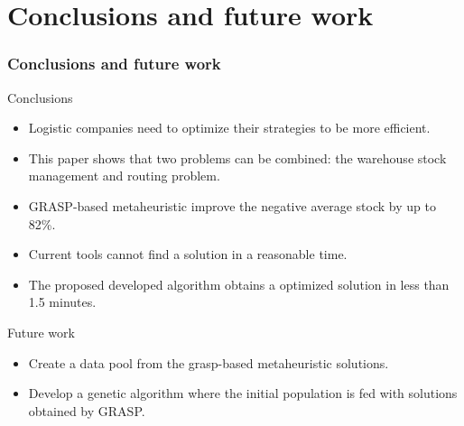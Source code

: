 \documentclass[t,compress,11pt,xcolor=dvipsnames,pdf,english]{beamer}
\begin{document}
\section{Conclusions and future work}

\begin{frame}[c]{ }
    \frametitle{Conclusions and future work}
    \begin{block}{Conclusions}
        {
            \begin{itemize}
                \item Logistic companies need to optimize their strategies to be more efficient.
                \item This paper shows that two problems can be combined: the warehouse stock management and routing problem.
                \item GRASP-based metaheuristic improve the negative average stock by up to 82\%.
                \item Current tools cannot find a solution in a reasonable time. 
                \item The proposed developed algorithm obtains a optimized solution in less than 1.5 minutes.
            \end{itemize}
        }
    \end{block}
    \begin{block}{Future work}
        {
            \begin{itemize}
                \item Create a data pool from the grasp-based metaheuristic solutions.
                \item Develop a genetic algorithm where the initial population is fed with solutions obtained by GRASP.
            \end{itemize}
        }
    \end{block}
\end{frame}

\begin{frame}[c]{ }
    \titlepage %
\end{frame}
\end{document}
